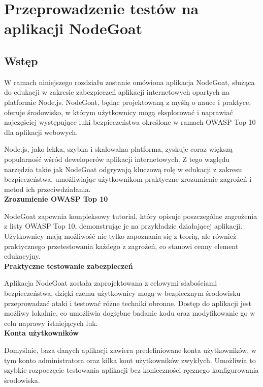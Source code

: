 \chapter{Przeprowadzenie testów na aplikacji NodeGoat}

\section{Wstęp}
\label{sec:wstep}
W ramach niniejszego rozdziału zostanie omówiona aplikacja NodeGoat, służąca do edukacji w zakresie zabezpieczeń aplikacji internetowych opartych na platformie Node.js. NodeGoat, będąc projektowaną z myślą o nauce i praktyce, oferuje środowisko, w którym użytkownicy mogą eksplorować i naprawiać najczęściej występujące luki bezpieczeństwa określone w ramach OWASP Top 10 dla aplikacji webowych.

Node.js, jako lekka, szybka i skalowalna platforma, zyskuje coraz większą popularność wśród deweloperów aplikacji internetowych. Z tego względu narzędzia takie jak NodeGoat odgrywają kluczową rolę w edukacji z zakresu bezpieczeństwa, umożliwiając użytkownikom praktyczne zrozumienie zagrożeń i metod ich przeciwdziałania.
\\

\textbf{Zrozumienie OWASP Top 10}

NodeGoat zapewnia kompleksowy tutorial, który opisuje poszczególne zagrożenia z listy OWASP Top 10, demonstrując je na przykładzie działającej aplikacji. Użytkownicy mają możliwość nie tylko zapoznania się z teorią, ale również praktycznego przetestowania każdego z zagrożeń, co stanowi cenny element edukacyjny.
\\

\textbf{Praktyczne testowanie zabezpieczeń}

Aplikacja NodeGoat została zaprojektowana z celowymi słabościami bezpieczeństwa, dzięki czemu użytkownicy mogą w bezpiecznym środowisku przeprowadzać ataki i testować różne techniki obronne. Dostęp do aplikacji jest możliwy lokalnie, co umożliwia dogłębne badanie kodu oraz modyfikowanie go w celu naprawy istniejących luk.
\\

\textbf{Konta użytkowników}

Domyślnie, baza danych aplikacji zawiera predefiniowane konta użytkowników, w tym konto administratora oraz kilka kont użytkowników zwykłych. Umożliwia to szybkie rozpoczęcie testowania aplikacji bez konieczności ręcznego konfigurowania środowiska.\\

